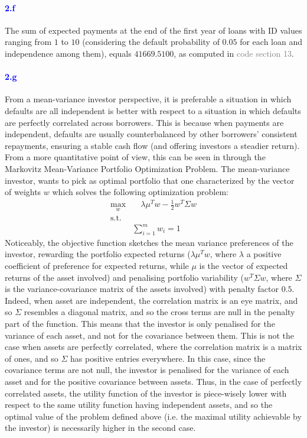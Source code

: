 \documentclass[a4paper,12pt]{article}
\begin{document}
\paragraph{\textcolor{Blue}{2.f}} The sum of expected payments at the end of the first year of loans with ID values ranging from $1$ to $10$ (considering the default probability of $0.05$ for each loan and independence among them), equals $41669.5100$, as computed in \textcolor{gray}{code section 13}.

\paragraph{\textcolor{Blue}{2.g}} From a mean-variance investor perspective, it is preferable a situation in which defaults are all independent is better with respect to a situation in which defaults are perfectly correlated across borrowers. This is because when payments are independent, defaults are usually counterbalanced by other borrowers' consistent repayments, ensuring a stable cash flow (and offering investors a steadier return). From a more quantitative point of view, this can be seen in through the Markovitz Mean-Variance Portfolio Optimization Problem. The mean-variance investor, wants to pick as optimal portfolio that one characterized by the vector of weights $w$ which solves the following optimization problem:
\begin{align*}
    \max_w &\quad \lambda \mu^T w - \frac{1}{2} w^T \Sigma w\\
    \text{s.t.}&\\
    & \sum_{i=1}^m w_i = 1
\end{align*}
Noticeably, the objective function sketches the mean variance preferences of the investor, rewarding the portfolio expected returns ($\lambda \mu^T w$, where $\lambda$ a positive coefficient of preference for expected returns, while $\mu$ is the vector of expected returns of the asset involved) and penalising portfolio variability ($w^T \Sigma w$, where $\Sigma$ is the variance-covariance matrix of the assets involved) with penalty factor $0.5$. Indeed, when asset are independent, the correlation matrix is an eye matrix, and so $\Sigma$ resembles a diagonal matrix, and so the cross terms are null in the penalty part of the function. This means that the investor is only penalised for the variance of each asset, and not for the covariance between them. This is not the case when assets are perfectly correlated, where the correlation matrix is a matrix of ones, and so $\Sigma$ has positive entries everywhere. In this case, since the covariance terms are not null, the investor is penalised for the variance of each asset and for the positive covariance between assets. Thus, in the case of perfectly correlated assets, the utility function of the investor is piece-wisely lower with respect to the same utility function having independent assets, and so the optimal value of the problem defined above (i.e. the maximal utility achievable by the investor) is necessarily higher in the second case.
\end{document}
